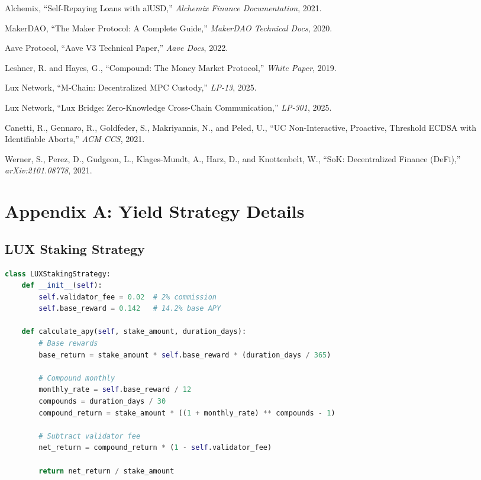 \documentclass[11pt,a4paper]{article}
\begin{document}

\begin{thebibliography}{99}

Alchemix, ``Self-Repaying Loans with alUSD,'' \textit{Alchemix Finance Documentation}, 2021.

MakerDAO, ``The Maker Protocol: A Complete Guide,'' \textit{MakerDAO Technical Docs}, 2020.

Aave Protocol, ``Aave V3 Technical Paper,'' \textit{Aave Docs}, 2022.

Leshner, R. and Hayes, G., ``Compound: The Money Market Protocol,'' \textit{White Paper}, 2019.

Lux Network, ``M-Chain: Decentralized MPC Custody,'' \textit{LP-13}, 2025.

Lux Network, ``Lux Bridge: Zero-Knowledge Cross-Chain Communication,'' \textit{LP-301}, 2025.

Canetti, R., Gennaro, R., Goldfeder, S., Makriyannis, N., and Peled, U., ``UC Non-Interactive, Proactive, Threshold ECDSA with Identifiable Aborts,'' \textit{ACM CCS}, 2021.

Werner, S., Perez, D., Gudgeon, L., Klages-Mundt, A., Harz, D., and Knottenbelt, W., ``SoK: Decentralized Finance (DeFi),'' \textit{arXiv:2101.08778}, 2021.

\end{thebibliography}

\appendix

\section{Appendix A: Yield Strategy Details}

\subsection{LUX Staking Strategy}

\begin{lstlisting}[language=Python, basicstyle=\footnotesize\ttfamily]
class LUXStakingStrategy:
    def __init__(self):
        self.validator_fee = 0.02  # 2% commission
        self.base_reward = 0.142   # 14.2% base APY
        
    def calculate_apy(self, stake_amount, duration_days):
        # Base rewards
        base_return = stake_amount * self.base_reward * (duration_days / 365)
        
        # Compound monthly
        monthly_rate = self.base_reward / 12
        compounds = duration_days / 30
        compound_return = stake_amount * ((1 + monthly_rate) ** compounds - 1)
        
        # Subtract validator fee
        net_return = compound_return * (1 - self.validator_fee)
        
        return net_return / stake_amount
\end{lstlisting}
\end{document}
